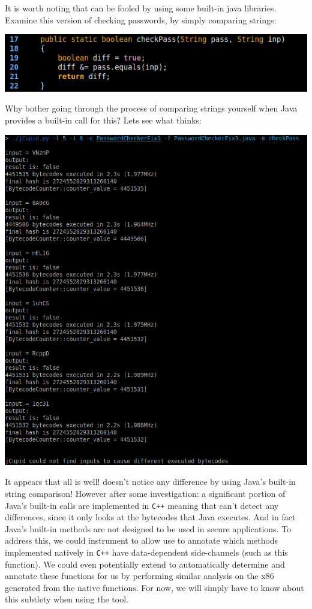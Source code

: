 It is worth noting that \jcupid can be fooled by using some built-in java libraries. Examine this version
of checking passwords, by simply comparing strings:

\begin{center}
  \includegraphics[width=\linewidth]{PasswordCheckerFix3}
\end{center}

Why bother going through the process of comparing strings yourself when Java provides a built-in call for
this? Lets see what \jcupid thinks:

\begin{center}
  \includegraphics[width=\linewidth]{jCupidRun4}
\end{center}

It appears that all is well! \jcupid doesn't notice any difference by using Java's built-in string comparison!
However after some investigation: a significant portion of Java's built-in calls are implemented in \texttt{C++}
meaning that \jcupid can't detect any differences, since it only looks at the bytecodes that Java executes. And
in fact Java's built-in methods are not designed to be used in secure
applications. To address this, we could instrument \jcupid to allow use to
annotate which methods implemented natively in \texttt{C++} have data-dependent
side-channels (such as this function). We could even potentially extend \jcupid
to automatically determine and annotate these functions for us by performing
similar analysis on the x86 generated from the native functions. For now, we
will simply have to know about this subtlety when using the tool.


